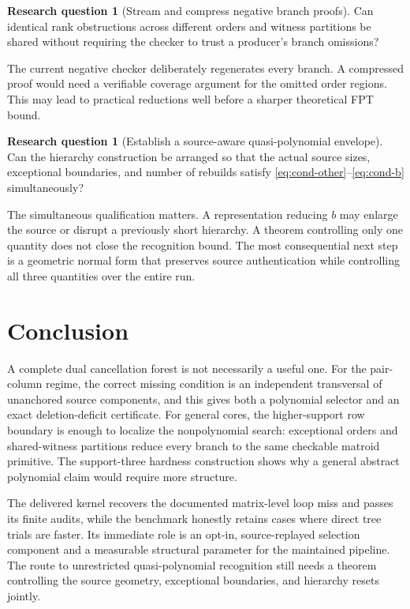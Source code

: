 \documentclass[11pt,letterpaper]{article}
\theoremstyle{definition}
\newtheorem{question}[theorem]{Research question}
\theoremstyle{remark}
\begin{document}
\begin{question}[Stream and compress negative branch proofs]
Can identical rank obstructions across different orders and witness partitions
be shared without requiring the checker to trust a producer's branch omissions?
\end{question}
The current negative checker deliberately regenerates every branch. A compressed
proof would need a verifiable coverage argument for the omitted order regions.
This may lead to practical reductions well before a sharper theoretical FPT bound.

\begin{question}[Establish a source-aware quasi-polynomial envelope]
Can the hierarchy construction be arranged so that the actual source sizes,
exceptional boundaries, and number of rebuilds satisfy
\eqref{eq:cond-other}--\eqref{eq:cond-b} simultaneously?
\end{question}
The simultaneous qualification matters. A representation reducing $b$ may enlarge
the source or disrupt a previously short hierarchy. A theorem controlling only
one quantity does not close the recognition bound. The most consequential next
step is a geometric normal form that preserves source authentication while
controlling all three quantities over the entire run.

\section{Conclusion}
A complete dual cancellation forest is not necessarily a useful one. For the
pair-column regime, the correct missing condition is an independent transversal
of unanchored source components, and this gives both a polynomial selector and
an exact deletion-deficit certificate. For general cores, the higher-support row
boundary is enough to localize the nonpolynomial search: exceptional orders and
shared-witness partitions reduce every branch to the same checkable matroid
primitive. The support-three hardness construction shows why a general abstract
polynomial claim would require more structure.

The delivered kernel recovers the documented matrix-level loop miss and passes
its finite audits, while the benchmark honestly retains cases where direct tree
trials are faster. Its immediate role is an opt-in, source-replayed selection
component and a measurable structural parameter for the maintained pipeline.
The route to unrestricted quasi-polynomial recognition still needs a theorem
controlling the source geometry, exceptional boundaries, and hierarchy resets
jointly.
\end{document}

